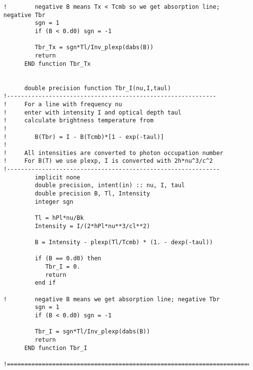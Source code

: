 \documentclass[preprint,12pt]{aastex}
\begin{document}
\begin{verbatim}
!        negative B means Tx < Tcmb so we get absorption line; negative Tbr
         sgn = 1
         if (B < 0.d0) sgn = -1

         Tbr_Tx = sgn*Tl/Inv_plexp(dabs(B))
         return
      END function Tbr_Tx


      double precision function Tbr_I(nu,I,taul)
!------------------------------------------------------------
!     For a line with frequency nu
!     enter with intensity I and optical depth taul
!     calculate brightness temperature from
!
!        B(Tbr) = I - B(Tcmb)*[1 - exp(-taul)]
!
!     All intensities are converted to photon occupation number
!     For B(T) we use plexp, I is converted with 2h*nu^3/c^2
!-------------------------------------------------------------
         implicit none
         double precision, intent(in) :: nu, I, taul
         double precision B, Tl, Intensity
         integer sgn

         Tl = hPl*nu/Bk
         Intensity = I/(2*hPl*nu**3/cl**2)

         B = Intensity - plexp(Tl/Tcmb) * (1. - dexp(-taul))

         if (B == 0.d0) then
            Tbr_I = 0.
            return
         end if

!        negative B means we get absorption line; negative Tbr
         sgn = 1
         if (B < 0.d0) sgn = -1

         Tbr_I = sgn*Tl/Inv_plexp(dabs(B))
         return
      END function Tbr_I

!========================================================================

\end{verbatim}
\end{document}
